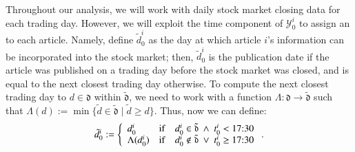 
%

\bx 
Throughout our analysis, we will work with daily stock market closing data for each trading day. However, we will exploit the time component of $\mathcal Y_0^i$ to assign an  to each article. Namely, define $\tilde d_0^i$ as the day at which article $i$'s information can be incorporated into the stock market; then, $\tilde d_0^i$ is the publication date if the article was published on a trading day before the stock market was closed, and is equal to the next closest trading day otherwise. 
To compute the next closest trading day to $d\in\mathfrak d$ within $\tilde{\mathfrak d}$, we need to work with a function $\Lambda:\mathfrak d \to \tilde{\mathfrak d}$ such that  
$\Lambda(d) 
:= 
\min \{ \tilde{d} \in \tilde{\mathfrak{d}} \mid \tilde{d} \geq d \}$. 
Thus, now we can define:
\begin{align*}
\tilde{d}_0^i :=
\mycases{llll}{
d_0^i & \IF & d_0^i \in \tilde{\mathfrak d} ~\wedge~t_0^i < \t{17:30}
\\
\Lambda(d_0^i)
& \IF & d_0^i \not \in \tilde{\mathfrak d} ~\vee~t_0^i \geq  \t{17:30}
}
.
\end{align*}


